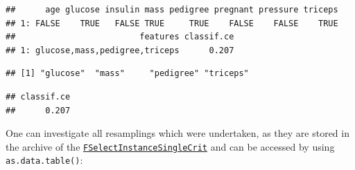 \documentclass[
]{scrbook}
\newenvironment{Shaded}{\begin{snugshade}}{\end{snugshade}}
\newcommand{\CommentTok}[1]{\textcolor[rgb]{0.56,0.35,0.01}{\textit{#1}}}
\newcommand{\FunctionTok}[1]{\textcolor[rgb]{0.00,0.00,0.00}{#1}}
\newcommand{\NormalTok}[1]{#1}
\newcommand{\SpecialCharTok}[1]{\textcolor[rgb]{0.00,0.00,0.00}{#1}}
\newcommand{\StringTok}[1]{\textcolor[rgb]{0.31,0.60,0.02}{#1}}
\renewenvironment{Shaded} {\begin{snugshade}\small} {\end{snugshade}}
\begin{document}
\begin{Shaded}
\end{Shaded}

\begin{verbatim}
##      age glucose insulin mass pedigree pregnant pressure triceps
## 1: FALSE    TRUE   FALSE TRUE     TRUE    FALSE    FALSE    TRUE
##                         features classif.ce
## 1: glucose,mass,pedigree,triceps      0.207
\end{verbatim}

\begin{Shaded}
\end{Shaded}

\begin{verbatim}
## [1] "glucose"  "mass"     "pedigree" "triceps"
\end{verbatim}

\begin{Shaded}
\end{Shaded}

\begin{verbatim}
## classif.ce 
##      0.207
\end{verbatim}

One can investigate all resamplings which were undertaken, as they are stored in the archive of the \href{https://mlr3fselect.mlr-org.com/reference/FSelectInstanceSingleCrit.html}{\texttt{FSelectInstanceSingleCrit}} and can be accessed by using \texttt{as.data.table()}:

\begin{Shaded}
\end{Shaded}
\end{document}

